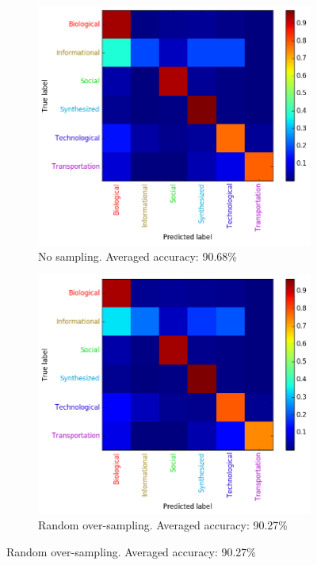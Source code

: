 \documentclass{article}
\begin{document}
\begin{figure}[H]
\begin{subfigure}{0.48\textwidth}
\includegraphics[width=\linewidth]{figs/similarity/Domain/None/confusion_None.png}
\caption{No sampling. Averaged accuracy: 90.68\%} \label{no_confusion}
\end{subfigure}\hspace*{\fill}
\begin{subfigure}{0.48\textwidth}
\includegraphics[width=\linewidth]{figs/similarity/Domain/RandomOver/confusion_RandomOver.png}
\caption{Random over-sampling. Averaged accuracy: 90.27\%} \label{random_over_confusion}
\end{subfigure}


\end{figure}
\end{document}
